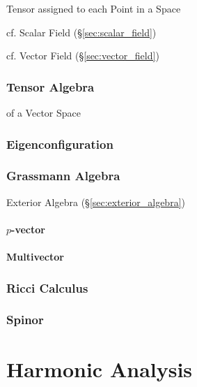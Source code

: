 Tensor assigned to each Point in a Space

cf. Scalar Field (\S\ref{sec:scalar_field})

cf. Vector Field (\S\ref{sec:vector_field})



\subsubsection{Tensor Algebra}\label{sec:tensor_algebra}

of a Vector Space



\subsubsection{Eigenconfiguration}\label{sec:eigenconfiguration}

\subsubsection{Grassmann Algebra}\label{sec:grassmann_algebra}

Exterior Algebra (\S\ref{sec:exterior_algebra})

\paragraph{$p$-vector}\label{sec:p_vector}\hfill

\paragraph{Multivector}\label{sec:multivector}\hfill


\subsubsection{Ricci Calculus}\label{sec:ricci_calculus}

\subsubsection{Spinor}\label{sec:spinor}



\section{Harmonic Analysis}\label{sec:harmonic_analysis}

